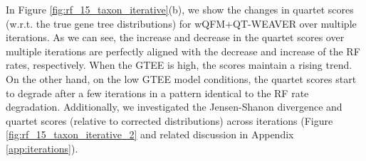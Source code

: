 \documentclass[10pt,a4paper]{article}
\begin{document}
In Figure \ref{fig:rf_15_taxon_iterative}(b), we show the changes in quartet scores (w.r.t. the true gene tree distributions) for wQFM+QT-WEAVER over multiple iterations. As we can see, the increase and decrease in the quartet scores over multiple iterations are perfectly aligned with the decrease and increase of the RF rates, respectively. When the GTEE is high, the scores maintain a rising trend. On the other hand, on the low GTEE model conditions, the quartet scores start to degrade after a few iterations in a pattern identical to the RF rate degradation. Additionally, we investigated the Jensen-Shanon divergence and quartet scores (relative to corrected distributions) across iterations (Figure \ref{fig:rf_15_taxon_iterative_2} and related discussion in Appendix \ref{app:iterations}).

\end{document}

